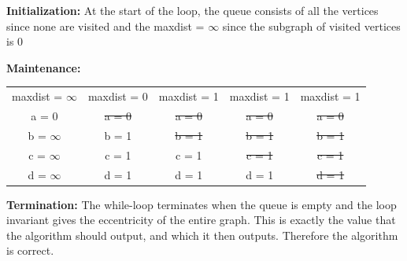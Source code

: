 \documentclass{article}
\begin{document}
\textbf{Initialization:} At the start of the loop, the queue consists of all the vertices since none are visited and the maxdist = $\infty$ since the subgraph of visited vertices is 0


\textbf{Maintenance:} 

\begin{center}
\begin{tabular}{ |c|c|c|c|c| } 
 \hline
maxdist = $\infty$ & maxdist = 0 & maxdist = 1 & maxdist = 1  & maxdist = 1  \\ 
a = 0 &  \sout{a = 0} & \sout{a = 0} & \sout{a = 0} & \sout{a = 0} \\ 
b = $\infty$ & b = 1 & \sout{b = 1} & \sout{b = 1} & \sout{b = 1}\\ 
c = $\infty$ & c = 1 & c = 1 & \sout{c = 1} & \sout{c = 1}\\ 
d = $\infty$ & d = 1 & d = 1 & d = 1 & \sout{d = 1}\\ 
 \hline
\end{tabular}
\end{center}


\textbf{Termination:} The while-loop terminates when the queue is empty and the loop invariant gives the eccentricity of the entire graph. This is exactly the value that the algorithm should output, and which it then outputs. Therefore the algorithm is correct.




\end{document}
